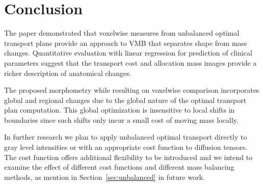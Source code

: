 \documentclass{llncs}
\begin{document}
\section{Conclusion}
The paper demonstrated that voxelwise measures from unbalanced optimal
transport plans provide an approach to VMB that separates shape from mass
changes. Quantitative evaluation with linear regression for prediction of
clinical parameters suggest that the transport cost and allocation mass images
provide a richer description of anatomical changes.

The proposed morphometry while resulting on voxelwise comparison incorporates
global and regional changes due to the global nature of the optimal transport
plan computation. This global optimization  is insensitive to local shifts
in boundaries since such shifts only incur a small cost of moving mass locally.

In further research we plan to apply unbalanced optimal transport directly to
gray level intensities or with an appropriate cost function to diffusion
tensors. The cost function offers additional flexibility to be introduced and
we intend to examine the effect of different cost functions and different mass
balancing methods, as mention in Section~\ref{sec:unbalanced} in future work. 



\end{document}

